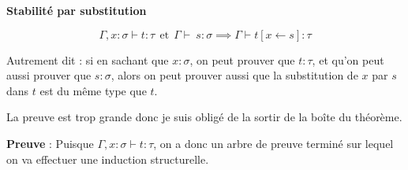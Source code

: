 \documentclass[11pt]{article}
\begin{document}
\begin{lemma}
    \textbf{Stabilité par substitution}

    $$\Gamma,x:\sigma\vdash t:\tau~~\text{et}~~\Gamma\vdash\ s:\sigma\implies\Gamma\vdash t\left[x \leftarrow s\right]:\tau$$

    Autrement dit : si en sachant que $x:\sigma$, on peut prouver que $t:\tau$, et qu'on peut aussi prouver que $s:\sigma$, alors on peut prouver aussi que la substitution de $x$ par $s$ dans $t$ est du même type que $t$.
\end{lemma}

La preuve est trop grande donc je suis obligé de la sortir de la boîte du théorème.

\textbf{Preuve} : Puisque $\Gamma,x:\sigma\vdash t:\tau$, on a donc un arbre de preuve terminé sur lequel on va effectuer une induction structurelle.
\end{document}
